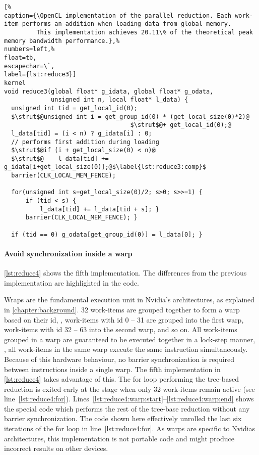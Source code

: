\begin{lstlisting}[%                                                             
caption={\OpenCL implementation of the parallel reduction. Each work-item performs an addition when loading data from global memory.
         This implementation achieves 20.11\% of the theoretical peak memory bandwidth performance.},%
numbers=left,%
float=tb,
escapechar=\`,
label={lst:reduce3}]
kernel
void reduce3(global float* g_idata, global float* g_odata,
             unsigned int n, local float* l_data) {
  unsigned int tid = get_local_id(0);
  $\strut$@unsigned int i = get_group_id(0) * (get_local_size(0)*2)@
                                   $\strut$@+ get_local_id(0);@
  l_data[tid] = (i < n) ? g_idata[i] : 0;
  // performs first addition during loading
  $\strut$@if (i + get_local_size(0) < n)@
  $\strut$@    l_data[tid] += g_idata[i+get_local_size(0)];@$\label{lst:reduce3:comp}$
  barrier(CLK_LOCAL_MEM_FENCE);

  for(unsigned int s=get_local_size(0)/2; s>0; s>>=1) {
      if (tid < s) {
          l_data[tid] += l_data[tid + s]; }
      barrier(CLK_LOCAL_MEM_FENCE); }

  if (tid == 0) g_odata[get_group_id(0)] = l_data[0]; }
\end{lstlisting}

\newpage

\paragraph{Avoid synchronization inside a warp}

\autoref{lst:reduce4} shows the fifth implementation.
The differences from the previous implementation are highlighted in the code.

Wraps are the fundamental execution unit in Nvidia's \GPU architectures, as explained in \autoref{chapter:background}.
32 work-items are grouped together to form a warp based on their id, \ie, work-items with id 0 -- 31 are grouped into the first warp, work-items with id 32 -- 63 into the second warp, and so on.
All work-items grouped in a warp are guaranteed to be executed together in a lock-step manner, \ie, all work-items in the same warp execute the same instruction simultaneously.
Because of this hardware behaviour, no barrier synchronization is required between instructions inside a single warp.
The fifth implementation in \autoref{lst:reduce4} takes advantage of this.
The for loop performing the tree-based reduction is exited early at the stage when only 32 work-items remain active (see line~\ref{lst:reduce4:for}).
Lines~\ref{lst:reduce4:warp:start}--\ref{lst:reduce4:warp:end} shows the special code which performs the rest of the tree-base reduction without any barrier synchronization.
The code shown here effectively unrolled the last six iterations of the for loop in line~\ref{lst:reduce4:for}.
As warps are specific to Nvidias \GPU architectures, this implementation is not portable \OpenCL code and might produce incorrect results on other \OpenCL devices.

